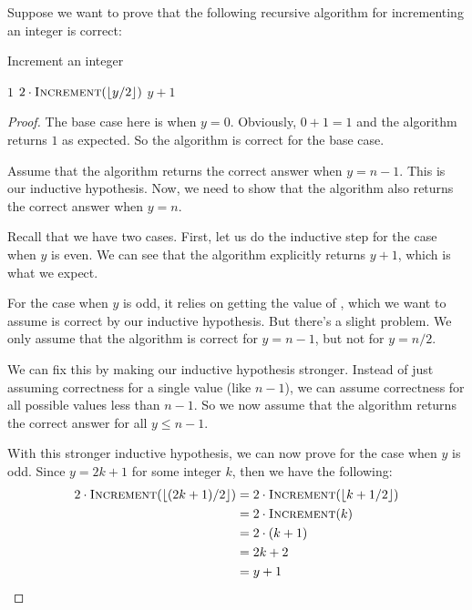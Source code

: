 \begin{example}
    Suppose we want to prove that the following recursive algorithm for incrementing an integer is correct:
    \begin{algorithm}[H]
        \caption{Increment an integer}
        \begin{algorithmic}[1]
                    \Return $1$
                \Else
                    \Return $2\cdot \text{\Call{Increment}{$\lfloor y/2\rfloor$}}$
                    \Else
                        \Return $y+1$
                    \EndIf
                \EndIf
            \EndFunction
        \end{algorithmic}
    \end{algorithm}

    \begin{proof}
        The base case here is when $y=0$. Obviously, $0+1=1$ and the algorithm returns $1$ as expected. So the algorithm is correct for the base case.

        Assume that the algorithm returns the correct answer when $y = n-1$. This is our inductive hypothesis. Now, we need to show that the algorithm also returns the correct answer when $y = n$.

        Recall that we have two cases. First, let us do the inductive step for the case when $y$ is even. We can see that the algorithm explicitly returns $y+1$, which is what we expect.

        For the case when $y$ is odd, it relies on getting the value of , which we want to assume is correct by our inductive hypothesis. But there's a slight problem. We only assume that the algorithm is correct for $y = n-1$, but not for $y = n/2$.

        We can fix this by making our inductive hypothesis stronger. Instead of just assuming correctness for a single value (like $n-1$), we can assume correctness for all possible values less than $n-1$. So we now assume that the algorithm returns the correct answer for all $y \le n-1$.

        With this stronger inductive hypothesis, we can now prove for the case when $y$ is odd. Since $y = 2k+1$ for some integer $k$, then we have the following:
        \begin{align*}
            2 \cdot \text{\Call{Increment}{$\lfloor (2k+1)/2\rfloor$}} &= 2 \cdot \text{\Call{Increment}{$\lfloor k+ 1/2\rfloor$}} \\
            &= 2 \cdot \text{\Call{Increment}{$k$}} \\
            &= 2 \cdot (k+1) \\
            &= 2k + 2 \\
            &= y+1
        \end{align*}


\end{proof}
\end{example}
